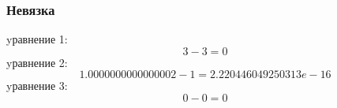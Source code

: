 \documentclass{article}
\begin{document}
\subsubsection{Невязка}
yравнение 1:
\begin{displaymath}
  3-3 = 0  
\end{displaymath}
yравнение 2:
\begin{displaymath}
  1.0000000000000002 - 1 = 2.220446049250313e-16
\end{displaymath}
yравнение 3:
\begin{displaymath}
  0 - 0 = 0
\end{displaymath}
\end{document}
